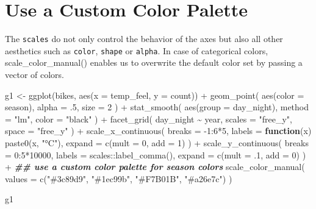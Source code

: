\documentclass[
]{krantz}
\makeatletter
\newenvironment{Shaded}{\begin{snugshade}}{\end{snugshade}}
\newcommand{\AttributeTok}[1]{\textcolor[rgb]{0.61,0.61,0.61}{#1}}
\newcommand{\ControlFlowTok}[1]{\textcolor[rgb]{0.27,0.27,0.27}{\textbf{#1}}}
\newcommand{\DecValTok}[1]{\textcolor[rgb]{0.06,0.06,0.06}{#1}}
\newcommand{\DocumentationTok}[1]{\textcolor[rgb]{0.37,0.37,0.37}{\textbf{\textit{#1}}}}
\newcommand{\FunctionTok}[1]{\textcolor[rgb]{0,0,0}{#1}}
\newcommand{\NormalTok}[1]{#1}
\newcommand{\OtherTok}[1]{\textcolor[rgb]{0.37,0.37,0.37}{#1}}
\newcommand{\SpecialCharTok}[1]{\textcolor[rgb]{0,0,0}{#1}}
\newcommand{\StringTok}[1]{\textcolor[rgb]{0.5,0.5,0.5}{#1}}
\newenvironment{kframe}{%
\medskip{}
\setlength{\fboxsep}{.8em}
 \def\at@end@of@kframe{}%
 \ifinner\ifhmode%
  \def\at@end@of@kframe{\end{minipage}}%
  \begin{minipage}{\columnwidth}%
 \fi\fi%
 \def\FrameCommand##1{\hskip\@totalleftmargin \hskip-\fboxsep
 \colorbox{shadecolor}{##1}\hskip-\fboxsep
     \hskip-\linewidth \hskip-\@totalleftmargin \hskip\columnwidth}%
 \MakeFramed {\advance\hsize-\width
   \@totalleftmargin\z@ \linewidth\hsize
   \@setminipage}}%
 {\par\unskip\endMakeFramed%
 \at@end@of@kframe}
\renewenvironment{Shaded}{\begin{kframe}}{\end{kframe}}
\makeatother
\begin{document}
\hypertarget{color-scaling}{%
\section{Use a Custom Color Palette}\label{color-scaling}}

The \texttt{scales} do not only control the behavior of the axes but also all other aesthetics such as \texttt{color}, \texttt{shape} or \texttt{alpha}. In case of categorical colors, scale\_color\_manual() enables us to overwrite the default color set by passing a vector of colors.

\begin{Shaded}
\begin{Highlighting}[]
\NormalTok{g1 }\OtherTok{\textless{}{-}} \FunctionTok{ggplot}\NormalTok{(bikes, }\FunctionTok{aes}\NormalTok{(}\AttributeTok{x =}\NormalTok{ temp\_feel, }\AttributeTok{y =}\NormalTok{ count)) }\SpecialCharTok{+} 
  \FunctionTok{geom\_point}\NormalTok{(}
    \FunctionTok{aes}\NormalTok{(}\AttributeTok{color =}\NormalTok{ season), }\AttributeTok{alpha =}\NormalTok{ .}\DecValTok{5}\NormalTok{, }\AttributeTok{size =} \DecValTok{2}
\NormalTok{  ) }\SpecialCharTok{+} 
  \FunctionTok{stat\_smooth}\NormalTok{(}
    \FunctionTok{aes}\NormalTok{(}\AttributeTok{group =}\NormalTok{ day\_night), }\AttributeTok{method =} \StringTok{"lm"}\NormalTok{, }\AttributeTok{color =} \StringTok{"black"}
\NormalTok{  ) }\SpecialCharTok{+}
  \FunctionTok{facet\_grid}\NormalTok{(}
\NormalTok{    day\_night }\SpecialCharTok{\textasciitilde{}}\NormalTok{ year, }\AttributeTok{scales =} \StringTok{"free\_y"}\NormalTok{, }\AttributeTok{space =} \StringTok{"free\_y"}
\NormalTok{  ) }\SpecialCharTok{+}
  \FunctionTok{scale\_x\_continuous}\NormalTok{(}
    \AttributeTok{breaks =} \SpecialCharTok{{-}}\DecValTok{1}\SpecialCharTok{:}\DecValTok{6}\SpecialCharTok{*}\DecValTok{5}\NormalTok{, }\AttributeTok{labels =} \ControlFlowTok{function}\NormalTok{(x) }\FunctionTok{paste0}\NormalTok{(x, }\StringTok{"°C"}\NormalTok{), }\AttributeTok{expand =} \FunctionTok{c}\NormalTok{(}\AttributeTok{mult =} \DecValTok{0}\NormalTok{, }\AttributeTok{add =} \DecValTok{1}\NormalTok{)}
\NormalTok{  ) }\SpecialCharTok{+}
  \FunctionTok{scale\_y\_continuous}\NormalTok{(}
    \AttributeTok{breaks =} \DecValTok{0}\SpecialCharTok{:}\DecValTok{5}\SpecialCharTok{*}\DecValTok{10000}\NormalTok{, }\AttributeTok{labels =}\NormalTok{ scales}\SpecialCharTok{::}\FunctionTok{label\_comma}\NormalTok{(), }\AttributeTok{expand =} \FunctionTok{c}\NormalTok{(}\AttributeTok{mult =}\NormalTok{ .}\DecValTok{1}\NormalTok{, }\AttributeTok{add =} \DecValTok{0}\NormalTok{)}
\NormalTok{  ) }\SpecialCharTok{+}
  \DocumentationTok{\#\# use a custom color palette for season colors}
  \FunctionTok{scale\_color\_manual}\NormalTok{(}
    \AttributeTok{values =} \FunctionTok{c}\NormalTok{(}\StringTok{"\#3c89d9"}\NormalTok{, }\StringTok{"\#1ec99b"}\NormalTok{, }\StringTok{"\#F7B01B"}\NormalTok{, }\StringTok{"\#a26e7c"}\NormalTok{)}
\NormalTok{  )}

\NormalTok{g1}
\end{Highlighting}
\end{Shaded}
\end{document}
